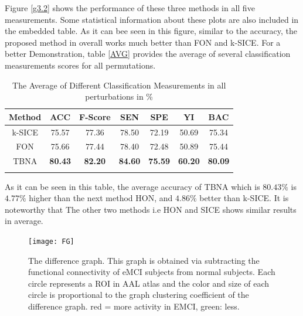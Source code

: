 \documentclass[journal]{IEEEtran}
\begin{document}
{	
	Figure \eqref{g3.2} shows the performance of these three methods in all five measurements. Some statistical information about these plots are also included in the embedded table. As it can bee seen in this figure, similar to the accuracy, the proposed method in overall works much better than FON and k-SICE. For a better Demonstration, table \eqref{AVG} provides the average of several classification measurements scores for all permutations. 
	\begin{table}
		\begin{center}
			\caption{The Average of Different Classification Measurements in all perturbations in \% }
			\begin{tabular}{@{}c*{6}{c}}
				\hline\hline
				Method&ACC& F-Score&SEN & SPE &YI & BAC 
				\\
				\hline
				k-SICE  &75.57& 77.36 & 78.50 & 72.19 & 50.69 & 75.34 
				\\
				FON   &75.66& 77.44 & 78.40 & 72.48 & 50.89 & 75.44  
				\\
				TBNA &\textbf{80.43}& \textbf{82.20} & \textbf{84.60} & \textbf{75.59} & \textbf{60.20} & \textbf{80.09}
				
				\\
				
				\hline\hline
				\label{AVG}
			\end{tabular}
		\end{center}
	\end{table}
	As it can be seen in this table, the average accuracy of TBNA which is $80.43 \%$ is $4.77\%$ higher than the next method HON, and $4.86 \%$ better than k-SICE. It is noteworthy that The other two methods i.e HON and SICE shows similar results in average.  
	
	\begin{figure}
		\centering
		\texttt{[image: FG]}
		\caption{
			The difference graph. This graph is obtained via subtracting the functional connectivity of eMCI subjects from normal subjects. Each circle represents a ROI in AAL atlas and the color and size of each circle is proportional to the graph clustering coefficient of the difference graph. red = more activity in EMCI, green: less. 
		}
		\label{g3.3}
	\end{figure}
	
}
\end{document}
